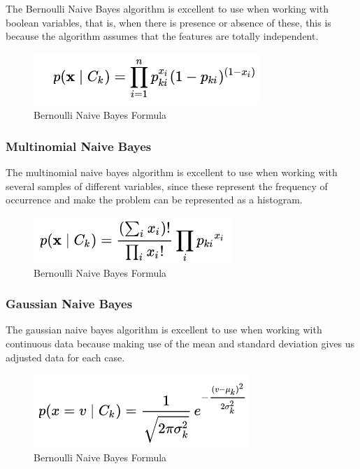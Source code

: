 \documentclass[sigconf,12pt,review=false,natbib=false]{acmart}
\begin{document}
The Bernoulli Naive Bayes algorithm is excellent to use when working with boolean variables, that is,
when there is presence or absence of these, this is because the algorithm assumes that the features are
totally independent. \\

\begin{figure}[h!]
    \centering
    \includegraphics[]{bernoulli}
    \caption{Bernoulli Naive Bayes Formula}
    \label{fig:bnbf}
\end{figure}

\subsubsection{Multinomial Naive Bayes}

The multinomial naive bayes algorithm is excellent to use when working with several samples of different
variables, since these represent the frequency of occurrence and make the problem can be represented
as a histogram. \\

\begin{figure}[h!]
    \centering
    \includegraphics[]{multinomial}
    \caption{Bernoulli Naive Bayes Formula}
    \label{fig:bnbf}
\end{figure}

\subsubsection{Gaussian Naive Bayes}

The gaussian naive bayes algorithm is excellent to use when working with continuous data because making
use of the mean and standard deviation gives us adjusted data for each case. \\

\begin{figure}[h!]
    \centering
    \includegraphics[]{gaussian}
    \caption{Bernoulli Naive Bayes Formula}
    \label{fig:bnbf}
\end{figure}
\end{document}
